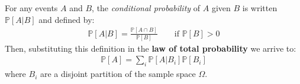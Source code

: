 \documentclass[../template.tex]{subfiles}
\begin{document}
For any events $A$ and $B$, the \textit{conditional probability} of $A$ given $B$ is written $\mathbb{P}[A|B]$ and defined by:
\begin{align*}
    \mathbb{P}[A|B] = \frac{\mathbb{P}[A \cap B]}{\mathbb{P}[B]} \qquad \text{if } \mathbb{P}[B] > 0
\end{align*} 
Then, substituting this definition in the \textbf{law of total probability} we arrive to:
\begin{align*}
    \mathbb{P}[A] = \sum_{i} \mathbb{P}[A|B_i] \mathbb{P}[B_i]
\end{align*} 
where $B_i$ are a disjoint partition of the sample space $\Omega$.
\end{document}
